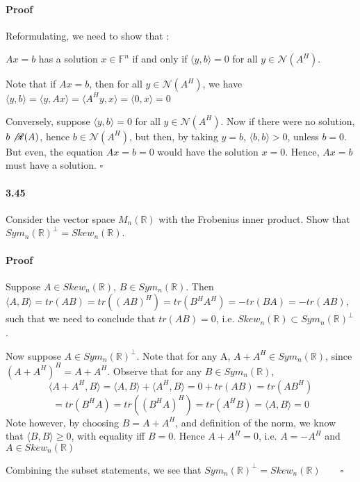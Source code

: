 \documentclass[letterpaper,12pt]{article}
\theoremstyle{definition}
\begin{document}
\paragraph{Proof} Reformulating, we need to show that :

$Ax = b$ has a solution $x \in \mathds{F}^n$ if and only if $\langle y, b \rangle =  0$ for all $y \in \mathscr{N}(A^H)$.

Note that if $Ax = b$, then for all $y \in \mathscr{N}(A^H)$, we have 
$\langle y, b \rangle
= \langle y, Ax \rangle
= \langle A^Hy, x \rangle
= \langle 0, x \rangle = 0$

Conversely, suppose $\langle y, b \rangle =  0$ for all $y \in \mathscr{N}(A^H)$. 
Now if there were no solution, $b \not \mathscr{R}(A)$, hence $b \in \mathscr{N}(A^H)$, but then, by taking $y = b$, $\langle b, b \rangle >  0$, unless $b = 0$. But even, the equation $Ax = b = 0$ would have the solution $x = 0$. Hence, $Ax = b$ must have a solution. $\square$



\paragraph{3.45} Consider the vector space $M_{n}(\mathds{R})$ with the Frobenius inner product. Show that $Sym_n(\mathds{R})^\bot = Skew_n(\mathds{R})$.

\paragraph{Proof} Suppose $A \in Skew_n(\mathds{R})$, $B \in Sym_n(\mathds{R})$. Then $\langle A, B \rangle = tr(AB) = tr((AB)^H) = tr(B^HA^H) = - tr(BA) = - tr(AB)$, such that we need to conclude that $tr(AB) = 0$, i.e. $Skew_n(\mathds{R}) \subset Sym_n(\mathds{R})^\bot$.

Now suppose $A \in Sym_n(\mathds{R})^\bot$. Note that for any A, $A + A^H \in Sym_n(\mathds{R})$, since $ (A + A^H)^H = A + A^H$.
Observe that for any $B \in Sym_n(\mathds{R})$, $$\langle A + A^H , B \rangle =  \langle A , B \rangle + \langle A^H , B \rangle = 0 + tr(AB) = tr(AB^H)$$ 
$$ = tr(B^HA) = tr((B^HA)^H) = tr(A^HB) =\langle A , B \rangle = 0 $$
Note however, by choosing $B = A + A^H$, and definition of the norm, we know that $\langle B, B \rangle \ge 0 $, with equality iff $B = 0$. Hence $A + A^H = 0$, i.e. $A = - A^H$ and $A \in Skew_n(\mathds{R})$

Combining the subset statements, we see that $Sym_n(\mathds{R})^\bot = Skew_n(\mathds{R})\qquad \square$
\end{document}

